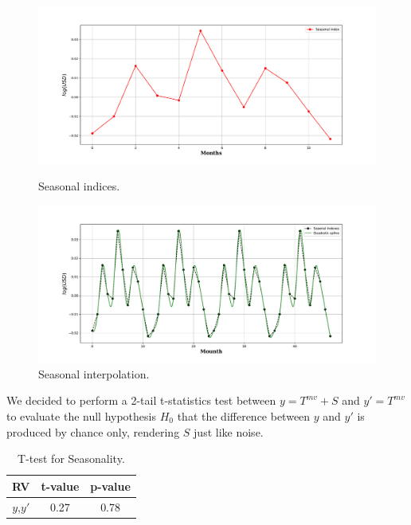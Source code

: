\begin{figure}[!tbp]
	\centering
	\begin{minipage}[b]{0.49\textwidth}
		\includegraphics[width=\textwidth]{notebooks/data/seasonal_index.pdf}
		\caption{Seasonal indices.}
	\end{minipage}
	\hfill
	\begin{minipage}[b]{0.49\textwidth}
		\includegraphics[width=\textwidth]{notebooks/data/seasonal_interpolation.pdf}
		\caption{Seasonal interpolation.}
		\label{fig:seasonal_interpolation}
	\end{minipage}
\end{figure}


We decided to perform a 2-tail t-statistics test between $y=T^{mv}+S$ and $y'=T^{mv}$ to evaluate the null hypothesis $H_{0}$ that the difference between $y$ and $y'$ is produced by chance only, rendering $S$ just like noise.



\begin{table}[h!]
	\begin{center}
		\begin{tabular}{||c c c||} 
			\hline
			RV & t-value & p-value \\ [0.5ex] 
			\hline\hline
			$y$,$y'$ & 0.27 & 0.78  \\ 
			\hline
		\end{tabular}
		\caption{T-test for Seasonality.}
		\label{table:t_test}
	\end{center}
\end{table}

